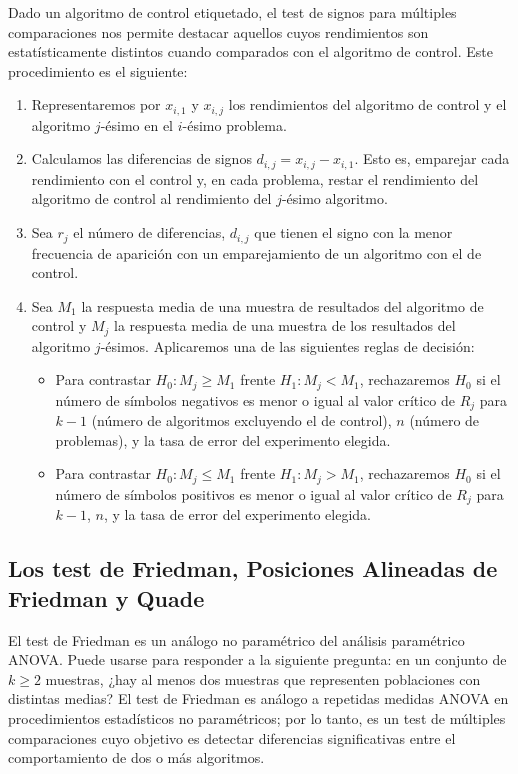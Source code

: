 Dado un algoritmo de control etiquetado, el test de signos para múltiples comparaciones nos permite destacar aquellos cuyos rendimientos son estatísticamente distintos cuando comparados con el algoritmo de control. 
Este procedimiento es el siguiente:
\begin{enumerate}
	\item Representaremos por $x_{i,1}$ y $x_{i,j}$ los rendimientos del algoritmo de control y el algoritmo $j$-ésimo en el $i$-ésimo problema.
	\item Calculamos las diferencias de signos $d_{i,j} = x_{i,j} - x_{i,1}$. 
Esto es, emparejar cada rendimiento con el control y, en cada problema, restar el rendimiento del algoritmo de control al rendimiento del $j$-ésimo algoritmo. 
	\item Sea $r_j$ el número de diferencias, $d_{i,j}$ que tienen el signo con la menor frecuencia de aparición con un emparejamiento de un algoritmo con el de control. 
	\item Sea $M_1$ la respuesta media de una muestra de resultados del algoritmo de control y $M_j$ la respuesta media de una muestra de los resultados del algoritmo $j$-ésimos. 
Aplicaremos una de las siguientes reglas de decisión:
	\begin{itemize}
		\item Para contrastar $H_0 : M_j \geq M_1$ frente $H_1:M_j < M_1$, rechazaremos $H_0$ si el número de símbolos negativos es menor o igual al valor crítico de $R_j$ para $k-1$ (número de algoritmos excluyendo el de control), $n$ (número de problemas), y la tasa de error del experimento elegida. 
		\item Para contrastar $H_0 : M_j \leq M_1$ frente $H_1:M_j > M_1$, rechazaremos $H_0$ si el número de símbolos positivos es menor o igual al valor crítico de $R_j$ para $k-1$, $n$, y la tasa de error del experimento elegida.  
	\end{itemize}
\end{enumerate}

\subsection{Los test de Friedman, Posiciones Alineadas de Friedman y Quade}

El test de Friedman es un análogo no paramétrico del análisis paramétrico ANOVA. 
Puede usarse para responder a la siguiente pregunta: 
en un conjunto de $k\geq 2$ muestras, ¿hay al menos dos muestras que representen poblaciones con distintas medias? 
El test de Friedman es análogo a repetidas medidas ANOVA en procedimientos estadísticos no paramétricos; por lo tanto, es un test de múltiples comparaciones cuyo objetivo es detectar diferencias significativas entre el comportamiento de dos o más algoritmos. 

